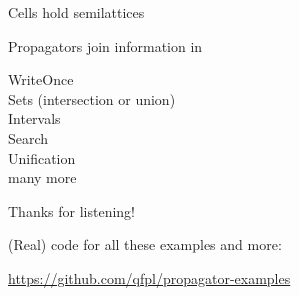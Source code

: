 \documentclass[UKenglish,usenames,dvipsnames,svgnames,table,aspectratio=169,mathserif]{beamer}
\newcommand{\nl}{\vspace{\baselineskip}}
\begin{document}
\begin{frame}
\LARGE \centering

Cells hold semilattices

Propagators join information in
\end{frame}


\begin{frame}

\centering
WriteOnce \\
Sets (intersection or union) \\
Intervals \\
Search \\
Unification \\
many more
\end{frame}


\begin{frame}
\huge \centering
Thanks for listening!
\nl

\large
(Real) code for all these examples and more:

\url{https://github.com/qfpl/propagator-examples}

\end{frame}
\end{document}
